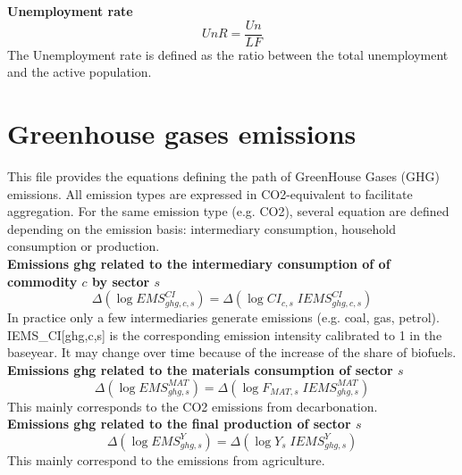 \documentclass[12pt]{article}
\numberwithin{equation}{section}
\begin{document}
\noindent \textbf{Unemployment rate} 
\begin{dmath}
UnR = \frac{Un}{LF}
\label{demography.mdlUnR}
\end{dmath}
The Unemployment rate is defined as the ratio between the total unemployment and the active population.


\section{Greenhouse gases emissions}


This file provides the equations defining the path of GreenHouse Gases (GHG) emissions. All emission types are expressed in CO2-equivalent to facilitate aggregation. For the same emission type (e.g. CO2), several equation are defined depending on the emission basis: intermediary consumption, household consumption or production. \\


\noindent \textbf{Emissions ghg related to the intermediary consumption of of commodity $c$ by sector $s$} 
\begin{dmath}
\varDelta \left(\operatorname{log} EMS^{CI}_{ghg, c, s}\right) = \varDelta \left(\operatorname{log} CI_{c, s} \; IEMS^{CI}_{ghg, c, s}\right)
\label{ghg_emissions.mdlEMS_CI[ghg,c,s]}
\end{dmath}
In practice only a few intermediaries generate emissions (e.g. coal, gas, petrol). IEMS_CI[ghg,c,s] is the corresponding emission intensity calibrated to 1 in the baseyear. It may change over time because of the increase of the share of biofuels. \\

\noindent \textbf{Emissions ghg related to the  materials consumption of sector $s$} 
\begin{dmath}
\varDelta \left(\operatorname{log} EMS^{MAT}_{ghg, s}\right) = \varDelta \left(\operatorname{log} F_{MAT, s} \; IEMS^{MAT}_{ghg, s}\right)
\label{ghg_emissions.mdlEMS_MAT[ghg,s]}
\end{dmath}
This mainly corresponds to the CO2 emissions from decarbonation. \\

\noindent \textbf{Emissions ghg related to the final production of sector $s$} 
\begin{dmath}
\varDelta \left(\operatorname{log} EMS^{Y}_{ghg, s}\right) = \varDelta \left(\operatorname{log} Y_{s} \; IEMS^{Y}_{ghg, s}\right)
\label{ghg_emissions.mdlEMS_Y[ghg,s]}
\end{dmath}
This mainly correspond to the emissions from agriculture. \\
\end{document}
